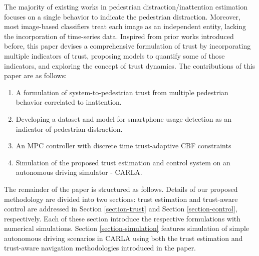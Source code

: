 \documentclass[journal]{IEEEtran}
\begin{document}
The majority of existing works in pedestrian distraction/inattention estimation focuses on a single behavior to indicate the pedestrian distraction. Moreover, most image-based classifiers treat each image as an independent entity, lacking the incorporation of time-series data. Inspired from prior works introduced before, this paper devises a comprehensive formulation of trust by incorporating multiple indicators of trust, proposing models to quantify some of those indicators, and exploring the concept of trust dynamics.
The contributions of this paper are as follows:

\begin{enumerate}
\item A formulation of system-to-pedestrian trust from multiple pedestrian behavior correlated to inattention. 
\item Developing a dataset and model for smartphone usage detection as an indicator of pedestrian distraction.
\item An MPC controller with discrete time trust-adaptive CBF constraints
\item Simulation of the proposed trust estimation and control system on an autonomous driving simulator - CARLA.
\end{enumerate}
The remainder of the paper is structured as follows. Details of our proposed methodology are divided into two sections: trust estimation and trust-aware control are addressed in Section \ref{section-trust} and Section \ref{section-control}, respectively. Each of these section introduce the respective formulations with numerical simulations. Section \ref{section-simulation} features simulation of simple autonomous driving scenarios in CARLA using both the trust estimation and trust-aware navigation methodologies introduced in the paper. 
\end{document}

